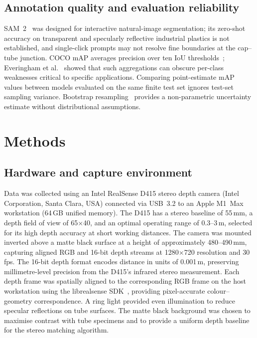 \documentclass{Academic}
\begin{document}
\subsection{Annotation quality and evaluation reliability}
SAM~2~\supercite{ravi2024sam2} was designed for interactive natural-image segmentation; its zero-shot accuracy on transparent and specularly reflective industrial plastics is not established, and single-click prompts may not resolve fine boundaries at the cap--tube junction. COCO mAP averages precision over ten IoU thresholds~\supercite{lin2014coco}; Everingham et al.~\supercite{everingham2015pascal} showed that such aggregations can obscure per-class weaknesses critical to specific applications. Comparing point-estimate mAP values between models evaluated on the same finite test set ignores test-set sampling variance. Bootstrap resampling~\supercite{efron1994bootstrap} provides a non-parametric uncertainty estimate without distributional assumptions.

\section{Methods}

\subsection{Hardware and capture environment}

Data was collected using an Intel RealSense D415 stereo depth camera (Intel Corporation, Santa Clara, USA) connected via USB~3.2 to an Apple M1~Max workstation (64\,GB unified memory). The D415 has a stereo baseline of 55\,mm, a depth field of view of 65\textdegree{}$\times$40\textdegree{}, and an optimal operating range of 0.3--3\,m, selected for its high depth accuracy at short working distances. The camera was mounted inverted above a matte black surface at a height of approximately 480--490\,mm, capturing aligned RGB and 16-bit depth streams at 1280$\times$720 resolution and 30\,fps. The 16-bit depth format encodes distance in units of 0.001\,m, preserving millimetre-level precision from the D415's infrared stereo measurement. Each depth frame was spatially aligned to the corresponding RGB frame on the host workstation using the librealsense SDK~\supercite{keselman2017realsense}, providing pixel-accurate colour--geometry correspondence. A ring light provided even illumination to reduce specular reflections on tube surfaces. The matte black background was chosen to maximise contrast with tube specimens and to provide a uniform depth baseline for the stereo matching algorithm.
\end{document}
